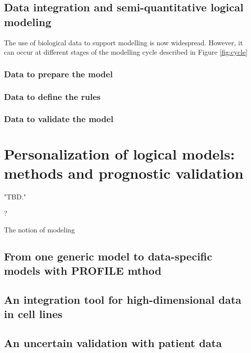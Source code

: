 \documentclass[a4paper,12pt,twoside,onecolumn,openright,final,oldfontcommands]{memoir}
\newcommand{\initial}[1]{
	\lettrine[lines=3,lhang=0.33,nindent=0em]{
		\color{gray}
     		{\textsc{#1}}}{}}
\begin{document}
\section{Data integration and semi-quantitative logical
modeling}\label{data-integration-and-semi-quantitative-logical-modeling}

The use of biological data to support modelling is now widespread.
However, it can occur at different stages of the modelling cycle
described in Figure \ref{fig:cycle}

\subsection{Data to prepare the model}\label{data-to-prepare-the-model}

\subsection{Data to define the rules}\label{data-to-define-the-rules}

\subsection{Data to validate the
model}\label{data-to-validate-the-model}

\chapter{Personalization of logical models: methods and prognostic
validation}\label{personalization-of-logical-models-methods-and-prognostic-validation}

\epigraph{"TBD."}{?}

\initial{T}he notion of modeling

\section{From one generic model to data-specific models with PROFILE
mthod}\label{from-one-generic-model-to-data-specific-models-with-profile-mthod}

\section{An integration tool for high-dimensional data in cell
lines}\label{an-integration-tool-for-high-dimensional-data-in-cell-lines}

\section{An uncertain validation with patient
data}\label{an-uncertain-validation-with-patient-data}
\end{document}
